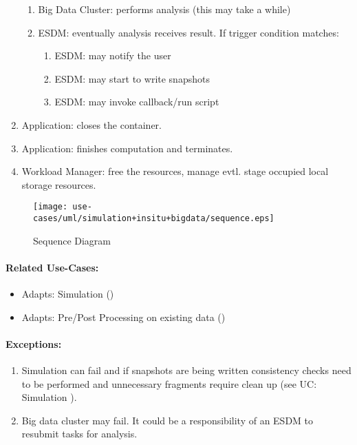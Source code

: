 \begin{enumerate}
\begin{enumerate}
		\item Big Data Cluster: performs analysis (this may take a while)
		\item ESDM: eventually analysis receives result. If trigger condition matches:
		\begin{enumerate}
			\item ESDM: may notify the user
			\item ESDM: may start to write snapshots
			\item ESDM: may invoke callback/run script
		\end{enumerate}
	\end{enumerate}
	\item Application: closes the container.
	\item Application: finishes computation and terminates.
	\item Workload Manager: free the resources, manage evtl. stage occupied local storage resources.
\end{enumerate}



\begin{figure}
	\centering
	\texttt{[image: use-cases/uml/simulation+insitu+bigdata/sequence.eps]}
	\caption{Sequence Diagram}
	\label{fig:sequence simulation + big data + in-situ}
\end{figure}



\paragraph{Related Use-Cases:}
\begin{itemize}
	\item Adapts: Simulation ()
	\item Adapts: Pre/Post Processing on existing data ()
\end{itemize}






\paragraph{Exceptions:}
\begin{enumerate}
	\item Simulation can fail and if snapshots are being written consistency checks need to be performed and unnecessary fragments require clean up (see UC: Simulation ).
	\item Big data cluster may fail. It could be a responsibility of an ESDM to resubmit tasks for analysis.
\end{enumerate}
